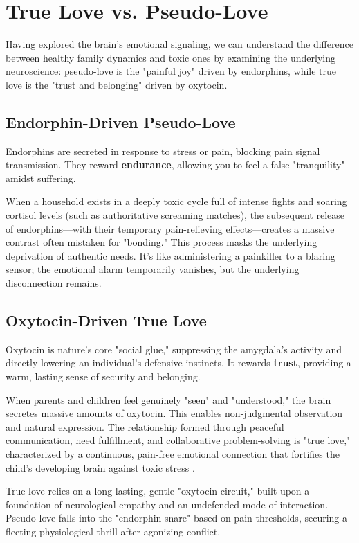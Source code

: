\section{True Love vs. Pseudo-Love}

Having explored the brain's emotional signaling, we can understand the difference between healthy family dynamics and toxic ones by examining the underlying neuroscience: pseudo-love is the "painful joy" driven by endorphins, while true love is the "trust and belonging" driven by oxytocin.

\subsection{Endorphin-Driven Pseudo-Love}
Endorphins are secreted in response to stress or pain, blocking pain signal transmission. 
They reward \textbf{endurance}, allowing you to feel a false "tranquility" amidst suffering. 

When a household exists in a deeply toxic cycle full of intense fights and soaring cortisol levels (such as authoritative screaming matches), the subsequent release of endorphins—with their temporary pain-relieving effects—creates a massive contrast often mistaken for "bonding." 
This process masks the underlying deprivation of authentic needs. 
It's like administering a painkiller to a blaring sensor; the emotional alarm temporarily vanishes, but the underlying disconnection remains.

\subsection{Oxytocin-Driven True Love}
Oxytocin is nature's core "social glue," \citep{porges2011} suppressing the amygdala's activity and directly lowering an individual's defensive instincts. 
It rewards \textbf{trust}, providing a warm, lasting sense of security and belonging. 

When parents and children feel genuinely "seen" and "understood," the brain secretes massive amounts of oxytocin. 
This enables non-judgmental observation and natural expression. 
The relationship formed through peaceful communication, need fulfillment, and collaborative problem-solving is "true love," characterized by a continuous, pain-free emotional connection that fortifies the child's developing brain against toxic stress \citep{vanderkolk2014}.

\begin{keyinsight}
True love relies on a long-lasting, gentle "oxytocin circuit," built upon a foundation of neurological empathy and an undefended mode of interaction. Pseudo-love falls into the "endorphin snare" based on pain thresholds, securing a fleeting physiological thrill after agonizing conflict.
\end{keyinsight}

